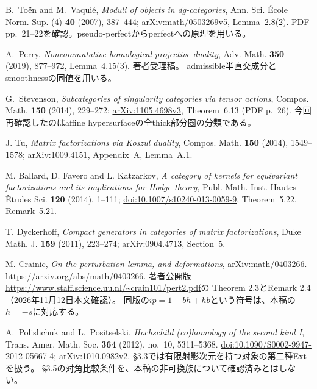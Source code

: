B.~To\"en and M.~Vaqui\'e, \emph{Moduli of objects in dg-categories},
Ann. Sci. \'Ecole Norm. Sup. (4) \textbf{40} (2007), 387--444;
\href{https://arxiv.org/abs/math/0503269}{arXiv:math/0503269v5}, Lemma~2.8(2).
PDF pp.~21--22を確認。pseudo-perfectからperfectへの原理を用いる。

A.~Perry, \emph{Noncommutative homological projective duality},
Adv. Math. \textbf{350} (2019), 877--972, Lemma~4.15(3).
\href{https://www.sciencedirect.com/science/article/am/pii/S000187081930221X}{著者受理稿}。
admissible半直交成分とsmoothnessの同値を用いる。

G.~Stevenson, \emph{Subcategories of singularity categories via tensor actions},
Compos. Math. \textbf{150} (2014), 229--272;
\href{https://arxiv.org/abs/1105.4698}{arXiv:1105.4698v3}, Theorem~6.13 (PDF p.~26).
今回再確認したのはaffine hypersurfaceの全thick部分圏の分類である。

J. Tu, \emph{Matrix factorizations via Koszul duality},
Compos. Math. \textbf{150} (2014), 1549--1578;
\href{https://arxiv.org/abs/1009.4151}{arXiv:1009.4151}, Appendix~A, Lemma~A.1.

M. Ballard, D. Favero and L. Katzarkov,
\emph{A category of kernels for equivariant factorizations and its implications for Hodge theory},
Publ. Math. Inst. Hautes \`Etudes Sci. \textbf{120} (2014), 1--111;
\href{https://doi.org/10.1007/s10240-013-0059-9}{doi:10.1007/s10240-013-0059-9},
Theorem~5.22, Remark~5.21.

T. Dyckerhoff, \emph{Compact generators in categories of matrix factorizations},
Duke Math. J. \textbf{159} (2011), 223--274;
\href{https://arxiv.org/abs/0904.4713}{arXiv:0904.4713}, Section~5.

M. Crainic,
\emph{On the perturbation lemma, and deformations},
arXiv:math/0403266.
\url{https://arxiv.org/abs/math/0403266}.
著者公開版\url{https://www.staff.science.uu.nl/~crain101/pert2.pdf}の
Theorem 2.3とRemark 2.4（2026年11月12日本文確認）。
同版の$ip=1+bh+hb$という符号は、本稿の$h=-s$に対応する。

A.~Polishchuk and L.~Positselski,
\emph{Hochschild (co)homology of the second kind I},
Trans. Amer. Math. Soc. \textbf{364} (2012), no.~10, 5311--5368.
\href{https://doi.org/10.1090/S0002-9947-2012-05667-4}{doi:10.1090/S0002-9947-2012-05667-4};
\href{https://arxiv.org/abs/1010.0982v2}{arXiv:1010.0982v2}.
\S3.3では有限射影次元を持つ対象の第二種Extを扱う。
\S3.5の対角比較条件を、本稿の非可換族について確認済みとはしない。


